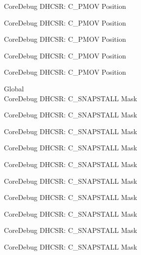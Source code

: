 \begin{DoxyRefList}
\label{deprecated__deprecated000480}%
%
Core\+Debug DHCSR\+: C\+\_\+\+PMOV Position 

\label{deprecated__deprecated000582}%
%
Core\+Debug DHCSR\+: C\+\_\+\+PMOV Position 

\label{deprecated__deprecated000707}%
%
Core\+Debug DHCSR\+: C\+\_\+\+PMOV Position 

\label{deprecated__deprecated001158}%
%
Core\+Debug DHCSR\+: C\+\_\+\+PMOV Position 

\label{deprecated__deprecated001260}%
%
Core\+Debug DHCSR\+: C\+\_\+\+PMOV Position  
\item[Global \doxylink{group___c_m_s_i_s___core_debug_ga53aa99b2e39a67622f3b9973e079c2b4}{Core\+Debug\+\_\+\+DHCSR\+\_\+\+C\+\_\+\+SNAPSTALL\+\_\+\+Msk} ]\hfill \\
\label{deprecated__deprecated000032}%
%
Core\+Debug DHCSR\+: C\+\_\+\+SNAPSTALL Mask 

\label{deprecated__deprecated000176}%
%
Core\+Debug DHCSR\+: C\+\_\+\+SNAPSTALL Mask 

\label{deprecated__deprecated000318}%
%
Core\+Debug DHCSR\+: C\+\_\+\+SNAPSTALL Mask 

\label{deprecated__deprecated000394}%
%
Core\+Debug DHCSR\+: C\+\_\+\+SNAPSTALL Mask 

\label{deprecated__deprecated000483}%
%
Core\+Debug DHCSR\+: C\+\_\+\+SNAPSTALL Mask 

\label{deprecated__deprecated000585}%
%
Core\+Debug DHCSR\+: C\+\_\+\+SNAPSTALL Mask 

\label{deprecated__deprecated000710}%
%
Core\+Debug DHCSR\+: C\+\_\+\+SNAPSTALL Mask 

\label{deprecated__deprecated000854}%
%
Core\+Debug DHCSR\+: C\+\_\+\+SNAPSTALL Mask 

\label{deprecated__deprecated000996}%
%
Core\+Debug DHCSR\+: C\+\_\+\+SNAPSTALL Mask 

\label{deprecated__deprecated001072}%
%
Core\+Debug DHCSR\+: C\+\_\+\+SNAPSTALL Mask 


\end{DoxyRefList}
